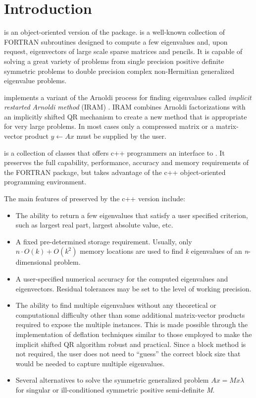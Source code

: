 \chapter{Introduction}

\ARPP{} is an object-oriented version of the \ARP{} package. \ARP{} \cite{T:6} is a well-known collection of FORTRAN subroutines designed to compute a few eigenvalues and, upon request, eigenvectors of large scale sparse matrices and pencils. It is capable of solving a great variety of problems from single precision positive definite symmetric problems to double precision complex non-Hermitian generalized eigenvalue problems. 

\ARP{} implements a variant of the Arnoldi process for finding eigenvalues called \textit{implicit restarted Arnoldi method} (IRAM) \cite{T:10, T:11}. IRAM combines Arnoldi factorizations with an implicitly shifted QR mechanism to create a new method that is appropriate for very large problems. In most cases only a compressed matrix or a matrix-vector product $y\leftarrow Ax$ must be supplied by the user.

\ARPP{} is a collection of classes that offers c++ programmers an interface to \ARP{}. It preserves the full capability, performance, accuracy and memory requirements of the FORTRAN package, but takes advantage of the c++ object-oriented programming environment.

The main features of \ARP{} preserved by the c++ version include:

\begin{itemize}
	\item The ability to return a few eigenvalues that satisfy a user specified criterion, such as largest real part, largest absolute value, etc.
	\item A fixed pre-determined storage requirement. Usually, only $n\cdot O(k)+O(k^2)$ memory locations are used to find \textit{k} eigenvalues of an \textit{n}-dimensional problem.
	\item A user-specified numerical accuracy for the computed eigenvalues and eigenvectors. Residual tolerances may be set to the level of working precision.
	\item The ability to find multiple eigenvalues without any theoretical or computational difficulty other than some additional matrix-vector products required to expose the multiple instances. This is made possible through the implementation of deflation techniques similar to those employed to make the implicit shifted QR algorithm robust and practical. Since a block method is not required, the user does not need to “guess” the correct block size that would be needed to capture multiple eigenvalues.
	\item Several alternatives to solve the symmetric generalized problem $Ax=Mx\lambda$ for singular or ill-conditioned symmetric positive semi-definite \textit{M}.
\end{itemize}

